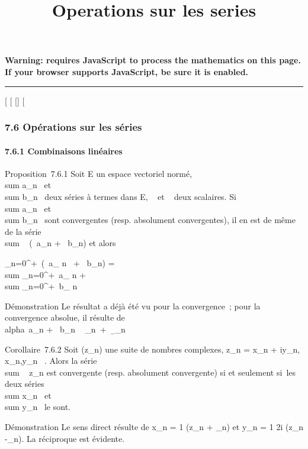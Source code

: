 \documentclass[]{article}
\title{Operations sur les series}
\author{}
\date{}
\begin{document}
\maketitle

\textbf{Warning: 
requires JavaScript to process the mathematics on this page.\\ If your
browser supports JavaScript, be sure it is enabled.}

\begin{center}\rule{3in}{0.4pt}\end{center}

[
[
[]
[

\subsubsection{7.6 Opérations sur les séries}

\paragraph{7.6.1 Combinaisons linéaires}

Proposition~7.6.1 Soit E un espace vectoriel normé,
\\sum  a_n~ et
\\sum  b_n~ deux
séries à termes dans E, \alpha~ et \beta~ deux scalaires. Si
\\sum  a_n~ et
\\sum  b_n~ sont
convergentes (resp. absolument convergentes), il en est de même de la
série \\sum ~
(\alpha~a_n + \beta~b_n) et alors

\sum _n=0^+\infty~(\alpha~a_ n~ +
\beta~b_n) = \alpha~\\sum
_n=0^+\infty~a_ n + \beta~\\sum
_n=0^+\infty~b_ n

Démonstration Le résultat a déjà été vu pour la convergence~; pour la
convergence absolue, il résulte de
\\alpha~a_n +
\beta~b_n\
\leq\alpha~\,\a_n\
+
\beta~\,\b_n\

Corollaire~7.6.2 Soit (z_n) une suite de nombres complexes,
z_n = x_n + iy_n, x_n,y_n \in
\mathbb{R}~. Alors la série \\sum ~
z_n est convergente (resp. absolument convergente) si et
seulement si~les deux séries
\\sum  x_n~ et
\\sum  y_n~ le
sont.

Démonstration Le sens direct résulte de x_n = 1
 (z_n +
\overlinez_n) et y_n = 1
\over 2i (z_n
-\overlinez_n). La réciproque est évidente.
\end{document}
